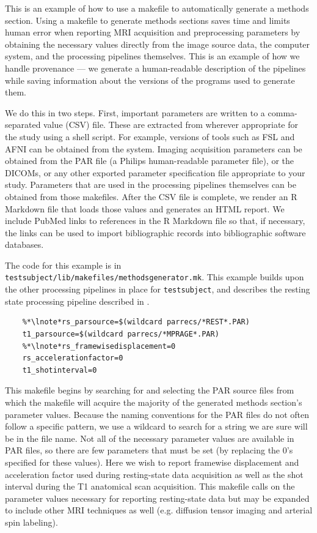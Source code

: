 \label{sec:provenance}
This is an example of how to use a makefile to automatically generate a methods section. Using a makefile to generate methods sections saves time and limits human error when reporting MRI acquisition and preprocessing parameters by obtaining the necessary values directly from the image source data, the computer system, and the processing pipelines themselves. This is an example of how we handle provenance --- we generate a human-readable description of the pipelines while saving information about the versions of the programs used to generate them. 

We do this in two steps. First, important parameters are written to a comma-separated value (CSV) file. These are extracted from wherever appropriate for the study using a \bashn{} shell script. For example, versions of tools such as FSL and AFNI can be obtained from the system. Imaging acquisition parameters can be obtained from the PAR file (a Philips human-readable parameter file), or the DICOMs, or any other exported parameter specification file appropriate to your study. Parameters that are used in the processing pipelines themselves can be obtained from those makefiles. After the CSV file is complete, we render an R Markdown file that loads those values and generates an HTML report. We include PubMed links to references in the R Markdown file so that, if necessary, the links can be used to import bibliographic records into bibliographic software databases. 

The code for this example is in \texttt{testsubject/lib/makefiles/methodsgenerator.mk}.  This example builds upon the other processing pipelines in place for \texttt{testsubject}, and describes the resting state processing pipeline described in .


\begin{lstlisting}
	%*\lnote*rs_parsource=$(wildcard parrecs/*REST*.PAR)
	t1_parsource=$(wildcard parrecs/*MPRAGE*.PAR)
	%*\lnote*rs_framewisedisplacement=0
	rs_accelerationfactor=0
	t1_shotinterval=0
\end{lstlisting}

This makefile begins by  searching for and selecting the PAR source files from which the makefile will acquire the majority of the generated methods section's parameter values. Because the naming conventions for the PAR files do not often follow a specific pattern, we use a wildcard to search for a string we are sure will be in the file name.  Not all of the necessary parameter values are available in PAR files, so there are few parameters that must be set (by replacing the 0's specified for these values). Here we wish to report framewise displacement and acceleration factor used during resting-state data acquisition as well as the shot interval during the T1 anatomical scan acquisition. This makefile calls on the parameter values necessary for reporting resting-state data but may be expanded to include other MRI techniques as well (e.g. diffusion tensor imaging and arterial spin labeling).

